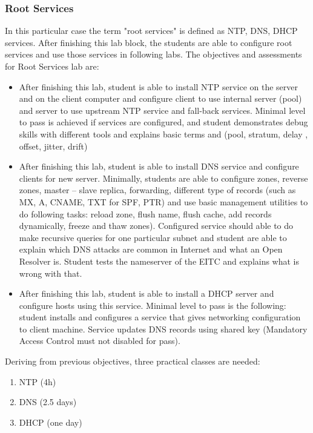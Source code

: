 \subsubsection{Root Services}
In this particular case the term "root services" is defined  as \gls{NTP}, \gls{DNS}, \gls{DHCP} services.
After finishing this lab block, the students are able to configure root services and use those services in following labs.
The objectives and assessments for Root Services lab are:
\begin{itemize}
\item After finishing this lab, student is able to install \gls{NTP} service on the server and on the client computer and configure client to use internal server (pool) and server to use upstream \gls{NTP} service and fall-back services. Minimal level to pass is achieved if services are configured, and student demonstrates debug skills with different tools and explains basic terms and (pool, stratum, delay , offset, jitter, drift)
\item After finishing this lab, student is able to install \gls{DNS} service and configure clients for new server. Minimally, students are able to configure zones, reverse zones, master -- slave replica, forwarding, different type of records (such as MX, A, CNAME, TXT for SPF, PTR) and use basic management utilities to do following tasks: reload zone, flush name, flush cache, add records dynamically, freeze and thaw zones). Configured service should able to do make recursive queries for one particular subnet and student are able to explain which \gls{DNS} attacks are common in Internet and what  an Open Resolver is. Student tests the nameserver of the \gls{EITC} and explains what is wrong with that.
\item After finishing this lab, student is able to install a \gls{DHCP} server and configure hosts using this service. Minimal level to pass is the following: student installs and configures a service that gives networking configuration to client machine. Service updates \gls{DNS} records using shared key (Mandatory Access Control must not disabled for pass).
\end{itemize}
Deriving from previous objectives, three practical classes are needed:
\begin{enumerate}[label=LAB \arabic*.,leftmargin=*]
  	\item NTP (4h)
  	\item DNS (2.5 days)
  	\item DHCP (one day)
\end{enumerate}

